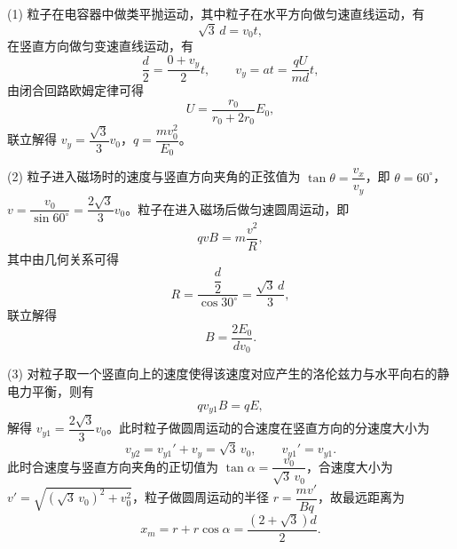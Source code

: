 \begin{answer}
(1) 粒子在电容器中做类平抛运动，其中粒子在水平方向做匀速直线运动，有
\[
  \sqrt{3}\,d=v_{0}t,
\]
在竖直方向做匀变速直线运动，有
\[
  \frac{d}{2}=\frac{0+v_{y}}{2}t,\qquad
  v_{y}=at=\frac{qU}{md}t,
\]
由闭合回路欧姆定律可得
\[
  U=\frac{r_{0}}{r_{0}+2r_{0}}E_{0},
\]
联立解得 $v_{y}=\dfrac{\sqrt{3}}{3}v_{0}$，$q=\dfrac{mv_{0}^{2}}{E_{0}}$。

(2) 粒子进入磁场时的速度与竖直方向夹角的正弦值为 $\tan\theta=\dfrac{v_{x}}{v_{y}}$，即 $\theta=60^{\circ}$，$v=\dfrac{v_{0}}{\sin60^{\circ}}=\dfrac{2\sqrt{3}}{3}v_{0}$。粒子在进入磁场后做匀速圆周运动，即
\[
  qvB=m\frac{v^{2}}{R},
\]
其中由几何关系可得
\[
  R=\frac{\dfrac{d}{2}}{\cos30^{\circ}}=\frac{\sqrt{3}\,d}{3},
\]
联立解得
\[
  B=\frac{2E_{0}}{dv_{0}}.
\]

(3) 对粒子取一个竖直向上的速度使得该速度对应产生的洛伦兹力与水平向右的静电力平衡，则有
\[
  qv_{y1}B=qE,
\]
解得 $v_{y1}=\dfrac{2\sqrt{3}}{3}v_{0}$。此时粒子做圆周运动的合速度在竖直方向的分速度大小为
\[
  v_{y2}=v_{y1}'+v_{y}=\sqrt{3}\,v_{0},\qquad v_{y1}'=v_{y1}.
\]
此时合速度与竖直方向夹角的正切值为 $\tan\alpha=\dfrac{v_{0}}{\sqrt{3}\,v_{0}}$，合速度大小为 $v'=\sqrt{(\sqrt{3}\,v_{0})^{2}+v_{0}^{2}}$，粒子做圆周运动的半径 $r=\dfrac{mv'}{Bq}$，故最远距离为
\[
  x_{m}=r+r\cos\alpha=\frac{(2+\sqrt{3})d}{2}.
\]
\end{answer}

